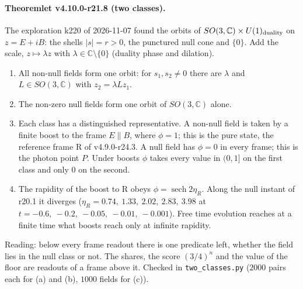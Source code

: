 \paragraph{Theoremlet v4.10.0-r21.8 (two classes).}
The exploration k220 of 2026-11-07 found the orbits of \(SO(3,\mathbb C)\times U(1)_{\rm duality}\) on \(z=E+iB\): the shells \(|s|=r>0\), the
punctured null cone and \(\{0\}\).  Add the scale, \(z\mapsto\lambda z\) with \(\lambda\in\mathbb C\setminus\{0\}\) (duality phase and dilation).
\begin{enumerate}[leftmargin=2em]
\item[(a)] All non-null fields form one orbit: for \(s_1,s_2\ne0\) there are \(\lambda\) and \(L\in SO(3,\mathbb C)\) with \(z_2=\lambda Lz_1\).
\item[(b)] The non-zero null fields form one orbit of \(SO(3,\mathbb C)\) alone.
\item[(c)] Each class has a distinguished representative.  A non-null field is taken by a finite boost to the frame \(E\parallel B\), where
\(\phi=1\); this is the pure state, the reference frame R of v4.9.0-r24.3.  A null field has \(\phi=0\) in every frame; this is the photon
point \(P\).  Under boosts \(\phi\) takes every value in \((0,1]\) on the first class and only \(0\) on the second.
\item[(d)] The rapidity of the boost to R obeys \(\phi=\operatorname{sech}2\eta_R\).  Along the null instant of r20.1 it diverges
(\(\eta_R=0.74,\ 1.33,\ 2.02,\ 2.83,\ 3.98\) at \(t=-0.6,\ -0.2,\ -0.05,\ -0.01,\ -0.001\)).  Free time evolution reaches at a finite time what
boosts reach only at infinite rapidity.
\end{enumerate}
Reading: below every frame readout there is one predicate left, whether the field lies in the null class or not.  The shares, the
score \((3/4)^n\) and the value of the floor are readouts of a frame above it.  Checked in \texttt{two\_\allowbreak classes.py}
(\(2000\) pairs each for (a) and (b), \(1000\) fields for (c)).

